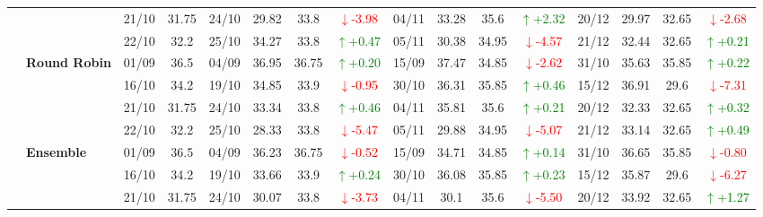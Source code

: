 \documentclass{ieeeaccess}
\begin{document}
{\begin{longtable}{llcc|cccc|cccc|cccc}
&
& 21/10 & 31.75 & 24/10 & 29.82 & 33.8 & \textcolor{red}{\(\downarrow\)-3.98} & 04/11 & 33.28 & 35.6 & \textcolor{green}{\(\uparrow\)+2.32} & 20/12 & 29.97 & 32.65 & \textcolor{red}{\(\downarrow\)-2.68} \\

&
& 22/10 & 32.2 & 25/10 & 34.27 & 33.8 & \textcolor{green}{\(\uparrow\)+0.47} & 05/11 & 30.38 & 34.95 & \textcolor{red}{\(\downarrow\)-4.57} & 21/12 & 32.44 & 32.65 & \textcolor{green}{\(\uparrow\)+0.21} \\
\cmidrule(lr){2-16}


& \textbf{Round Robin}
& 01/09 & 36.5 & 04/09 & 36.95 & 36.75 & \textcolor{green}{\(\uparrow\)+0.20} & 15/09 & 37.47 & 34.85 & \textcolor{red}{\(\downarrow\)-2.62} & 31/10 & 35.63 & 35.85 & \textcolor{green}{\(\uparrow\)+0.22} \\

&
& 16/10 & 34.2 & 19/10 & 34.85 & 33.9 & \textcolor{red}{\(\downarrow\)-0.95} & 30/10 & 36.31 & 35.85 & \textcolor{green}{\(\uparrow\)+0.46} & 15/12 & 36.91 & 29.6 & \textcolor{red}{\(\downarrow\)-7.31} \\

&
& 21/10 & 31.75 & 24/10 & 33.34 & 33.8 & \textcolor{green}{\(\uparrow\)+0.46} & 04/11 & 35.81 & 35.6 & \textcolor{green}{\(\uparrow\)+0.21} & 20/12 & 32.33 & 32.65 & \textcolor{green}{\(\uparrow\)+0.32} \\

&
& 22/10 & 32.2 & 25/10 & 28.33 & 33.8 & \textcolor{red}{\(\downarrow\)-5.47} & 05/11 & 29.88 & 34.95 & \textcolor{red}{\(\downarrow\)-5.07} & 21/12 & 33.14 & 32.65 & \textcolor{green}{\(\uparrow\)+0.49} \\
\cmidrule(lr){2-16}



& \textbf{Ensemble}
& 01/09 & 36.5 & 04/09 & 36.23 & 36.75 & \textcolor{red}{\(\downarrow\)-0.52} & 15/09 & 34.71 & 34.85 & \textcolor{green}{\(\uparrow\)+0.14} & 31/10 & 36.65 & 35.85 & \textcolor{red}{\(\downarrow\)-0.80} \\

&
& 16/10 & 34.2 & 19/10 & 33.66 & 33.9 & \textcolor{green}{\(\uparrow\)+0.24} & 30/10 & 36.08 & 35.85 & \textcolor{green}{\(\uparrow\)+0.23} & 15/12 & 35.87 & 29.6 & \textcolor{red}{\(\downarrow\)-6.27} \\

&
& 21/10 & 31.75 & 24/10 & 30.07 & 33.8 & \textcolor{red}{\(\downarrow\)-3.73} & 04/11 & 30.1 & 35.6 & \textcolor{red}{\(\downarrow\)-5.50} & 20/12 & 33.92 & 32.65 & \textcolor{green}{\(\uparrow\)+1.27} \\


\end{longtable}}
\end{document}
